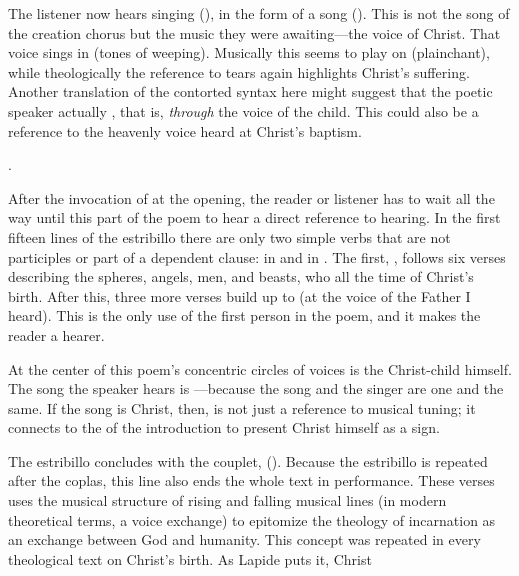 The listener now hears singing (), in the form of a song ().
This is not the song of the creation chorus but the music they were
awaiting---the voice of Christ.
That voice sings in  (tones of weeping).
Musically this seems to play on  (plainchant), while
theologically the reference to tears again highlights Christ's suffering.
Another translation of the contorted syntax here might suggest that the poetic
speaker actually , that is,
\emph{through} the voice of the child.
This could also be a reference to the heavenly voice heard at Christ's baptism.%
\begin{Footnote} 
    .
\end{Footnote}

After the invocation of  at the opening, the reader or listener
has to wait all the way until this part of the poem to hear a direct reference
to hearing.
In the first fifteen lines of the estribillo there are only two simple verbs
that are not participles or part of a dependent clause:  in
 and  in .
The first, , follows six verses describing the spheres, angels,
men, and beasts, who all  the time of Christ's birth.
After this, three more verses build up to  (at the
voice of the Father I heard).
This is the only use of the first person in the poem, and it makes the reader a
hearer.

At the center of this poem's concentric circles of voices is the Christ-child
himself.
The song the speaker hears is ---because the song and the singer are one and the same.
If the song is Christ, then,  is not
just a reference to musical tuning; it connects to the  of the
introduction to present Christ himself as a sign.

The estribillo concludes with the couplet,  ().
Because the estribillo is repeated after the coplas, this line also ends the
whole text in performance.
These verses uses the musical structure of rising and falling musical lines (in
modern theoretical terms, a voice exchange) to epitomize the theology of
incarnation as an exchange between God and humanity.
This concept was repeated in every theological text on Christ's birth.
As Lapide puts it, Christ %
    \Autocite
    [670, on ; the quotation from Anselm is .]
    {Lapide:Gospels19C}

